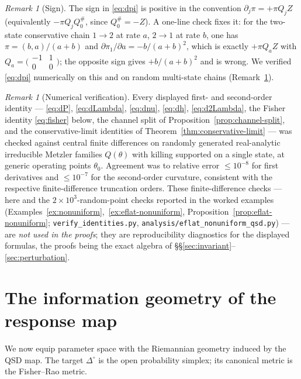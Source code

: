 \documentclass[11pt,reqno]{amsart}
\theoremstyle{plain}
\theoremstyle{definition}
\theoremstyle{remark}
\newtheorem{remark}[theorem]{Remark}
\newcommand{\Simp}{\Delta^{\!\circ}}
\begin{document}
\begin{remark}[Sign]\label{rem:sign}
The sign in \eqref{eq:dpi} is positive in the convention $\partial_j\pi=+\pi Q_jZ$
(equivalently $-\pi Q_jQ_0^{\#}$, since $Q_0^{\#}=-Z$). A one-line check fixes it:
for the two-state conservative chain $1\to2$ at rate $a$, $2\to1$ at rate $b$, one
has $\pi=(b,a)/(a+b)$ and $\partial\pi_1/\partial a=-b/(a+b)^2$, which is exactly
$+\pi Q_aZ$ with $Q_a=\bigl(\begin{smallmatrix}-1&1\\0&0\end{smallmatrix}\bigr)$;
the opposite sign gives $+b/(a+b)^2$ and is wrong. We verified \eqref{eq:dpi}
numerically on this and on random multi-state chains
(Remark~\ref{rem:numerics}).
\end{remark}

\begin{remark}[Numerical verification]\label{rem:numerics}
Every displayed first- and second-order identity ---
\eqref{eq:dP}, \eqref{eq:dLambda}, \eqref{eq:dnu}, \eqref{eq:dh},
\eqref{eq:d2Lambda}, the Fisher identity \eqref{eq:fisher} below, the channel
split of Proposition~\ref{prop:channel-split}, and the conservative-limit
identities of Theorem~\ref{thm:conservative-limit} --- was checked against central
finite differences on randomly generated real-analytic irreducible Metzler
families $Q(\theta)$ with killing supported on a single state, at generic
operating points $\theta_0$. Agreement was to relative error $\le10^{-8}$ for first
derivatives and $\le10^{-7}$ for the second-order curvature, consistent with the
respective finite-difference truncation orders. These finite-difference checks --- here and the
$2\times10^{3}$-random-point checks reported in the worked examples
(Examples~\ref{ex:nonuniform},~\ref{ex:eflat-nonuniform}, Proposition~\ref{prop:eflat-nonuniform};
\texttt{verify\_identities.py}, \texttt{analysis/eflat\_nonuniform\_qsd.py}) --- are \emph{not used in
the proofs}; they are reproducibility diagnostics for the displayed formulas, the proofs being the
exact algebra of \S\S\ref{sec:invariant}--\ref{sec:perturbation}.
\end{remark}


\section{The information geometry of the response map}\label{sec:infogeom}


We now equip parameter space with the Riemannian geometry induced by the QSD map.
The target $\Simp$ is the open probability simplex; its canonical metric is the
Fisher--Rao metric.
\end{document}
